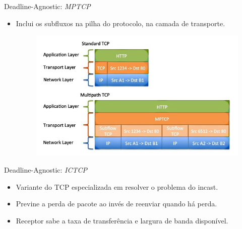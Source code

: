 \documentclass[aspectratio=169]{beamer}
\begin{document}
	\begin{frame} {Deadline-Agnostic: \textit{MPTCP}}
	    
	    \Large
	    \begin{itemize}
	                           
	    \item
	      Inclui os subfluxos na pilha do protocolo, na camada de transporte.
	  
	    \begin{figure}[ht]    
	        \includegraphics[scale=0.5]{imagens/mptcp_subfluxo.jpg}
	    \end{figure}
	        
	  \end{itemize}
	    
	\end{frame}  

	
	
	\begin{frame} {Deadline-Agnostic: \textit{ICTCP}}
	                
	
	    \Large
	    \begin{itemize}
	                           
	        \item
	            Variante do TCP especializada em resolver o problema do incast.
	        \item
	            Previne a perda de pacote ao invés de reenviar  quando há perda.
	        \item
	            Receptor sabe a taxa de transferência e largura de banda disponível.
	
	    \end{itemize}
	  
	\end{frame}
	  
\end{document}
